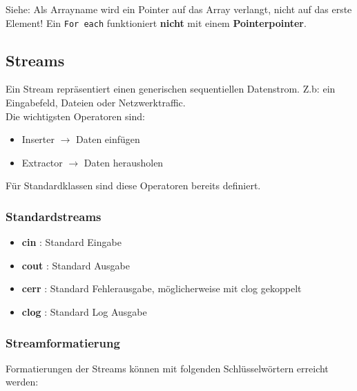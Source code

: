 

Siehe: Als Arrayname wird ein Pointer auf das Array verlangt, nicht auf das erste Element!  
Ein \verb|For each| funktioniert \textbf{nicht} mit einem \textbf{Pointerpointer}. 

\subsection{Streams}

Ein Stream repräsentiert einen generischen sequentiellen Datenstrom. Z.b: ein Eingabefeld, Dateien oder Netzwerktraffic.\\
Die wichtigsten Operatoren sind:

\begin{itemize}[itemsep=1pt, parsep=0pt]
    \item \say{$<<$} Inserter $\rightarrow$  Daten einfügen
    \item \say{$>>$} Extractor $\rightarrow$ Daten herausholen
\end{itemize}

Für Standardklassen sind diese Operatoren bereits definiert.

\subsubsection{Standardstreams}

\begin{itemize}[itemsep=1pt, parsep=0pt]
    \item \textbf{cin} : Standard Eingabe
    \item \textbf{cout} : Standard Ausgabe
    \item \textbf{cerr} : Standard Fehlerausgabe, möglicherweise mit clog gekoppelt 
    \item \textbf{clog} : Standard Log Ausgabe 
\end{itemize}

\subsubsection{Streamformatierung}

Formatierungen der Streams können mit folgenden Schlüsselwörtern erreicht werden:


